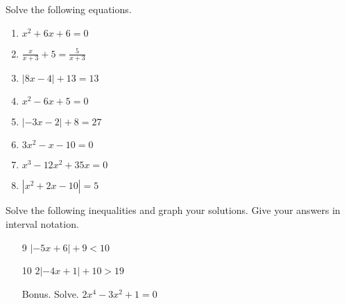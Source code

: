 \documentclass{article}
\begin{document}
\TestTitle[class={College Algebra}, name={Test 1}, term={Spring}, date={Sept. 11}, year={2015}, form={A}]

\AlgebraFacts

Solve the following equations.

\begin{enumerate}
\item 

$x^2 + 6x + 6 = 0$

   \vspace{4cm}

\item $\displaystyle\frac{x}{x + 3} + 5 = \displaystyle\frac{5}{x + 3}$ \vspace{4cm}

\item $|8x - 4| + 13 = 13$ \vspace{4cm}

\item $x^2 - 6x + 5 = 0$

   \vspace{4cm}

\newpage

\item $|-3x - 2| + 8 = 27$ \vspace{5cm}

\item $3x^2 - x - 10 = 0$

   \vspace{5cm}

\item $x^3 - 12x^2 + 35x = 0$

   \vspace{5cm}

\item $|x^2 + 2x - 10| = 5$

   \vspace{5cm}
\end{enumerate}

\newpage

Solve the following inequalities and graph your solutions. Give your answers in interval notation.

\begin{enumerate}
\item[9] $|-5x + 6| + 9 < 10$ \vspace{5cm}

\item[10] $2|-4x + 1| + 10 > 19$ \vspace{5cm}

\item[Bonus.] Solve. $2x^4 - 3x^2 + 1 = 0$

   \vspace{4cm}
\end{enumerate}
\end{document}

